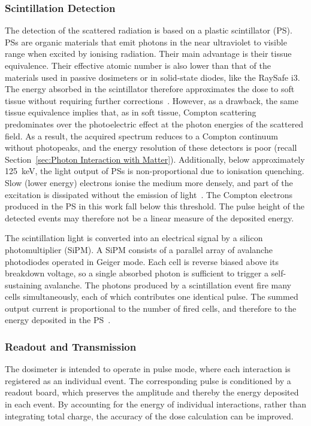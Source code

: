 \subsubsection{Scintillation Detection}
\label{sec:scintilator}
The detection of the scattered radiation is based on a plastic scintillator (PS). PSs are organic materials that emit photons in the near ultraviolet to visible range when excited by ionising radiation. Their main advantage is their tissue equivalence. Their effective atomic number is also lower than that of the materials used in passive dosimeters or in solid-state diodes, like the RaySafe i3. The energy absorbed in the scintillator therefore approximates the dose to soft tissue without requiring further corrections~\cite{129}. However, as a drawback, the same tissue equivalence implies that, as in soft tissue, Compton scattering predominates over the photoelectric effect at the photon energies of the scattered field. As a result, the acquired spectrum reduces to a Compton continuum without photopeaks, and the energy resolution of these detectors is poor (recall Section~\ref{sec:Photon Interaction with Matter}). Additionally, below approximately 125~keV, the light output of PSs is non-proportional due to ionisation quenching. Slow (lower energy) electrons ionise the medium more densely, and part of the excitation is dissipated without the emission of light~\cite{130}. The Compton electrons produced in the PS in this work fall below this threshold. The pulse height of the detected events may therefore not be a linear measure of the deposited energy.

The scintillation light is converted into an electrical signal by a silicon photomultiplier (SiPM). A SiPM consists of a parallel array of avalanche photodiodes operated in Geiger mode. Each cell is reverse biased above its breakdown voltage, so a single absorbed photon is sufficient to trigger a self-sustaining avalanche. The photons produced by a scintillation event fire many cells simultaneously, each of which contributes one identical pulse. The summed output current is proportional to the number of fired cells, and therefore to the energy deposited in the PS~\cite{14}.

\subsubsection{Readout and Transmission}
The dosimeter is intended to operate in pulse mode, where each interaction is registered as an individual event. The corresponding pulse is conditioned by a readout board, which preserves the amplitude and thereby the energy deposited in each event. By accounting for the energy of individual interactions, rather than integrating total charge, the accuracy of the dose calculation can be improved.

